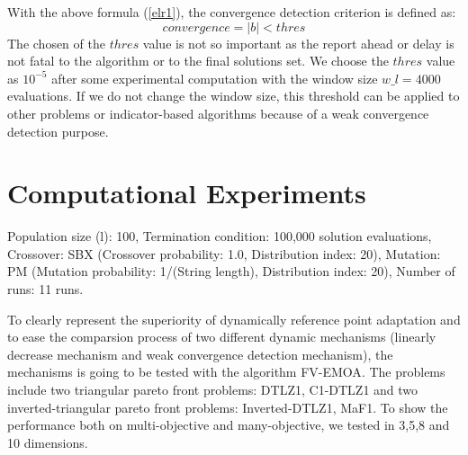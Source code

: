 \documentclass[conference]{IEEEtran}
\begin{document}
With the above formula (\ref{elr1}), the convergence detection criterion is defined as:
\begin{equation}\label{elr2}
  convergence = \lvert b \rvert < thres
\end{equation}
The chosen of the $thres$ value is not so important 
as the report ahead or delay is not fatal to the algorithm or to the final solutions set.
We choose the $thres$ value as $10^{-5}$ after some experimental computation with 
the window size $w\_ l = 4000$ evaluations. 
If we do not change the window size, 
this threshold can be applied to other problems or indicator-based algorithms
because of a weak convergence detection purpose.

% 
% 
%
\section{Computational Experiments}

Population size (l): 100,
Termination condition: 100,000 solution evaluations,
Crossover: SBX (Crossover probability: 1.0, Distribution index: 20),
Mutation: PM (Mutation probability: 1/(String length), Distribution index: 20),
Number of runs: 11 runs.

To clearly represent the superiority of dynamically reference point adaptation 
and to ease the comparsion process of two different dynamic mechanisms
(linearly decrease mechanism and weak convergence detection mechanism), 
the mechanisms is going to be tested with the algorithm FV-EMOA\cite{FVEMOA}. %
The problems include two triangular pareto front problems: 
DTLZ1\cite{DTLZ1}, C1-DTLZ1\cite{C1DTLZ1}
and two inverted-triangular pareto front problems: 
Inverted-DTLZ1\cite{IDTLZ1}, MaF1\cite{MaF1}.
To show the performance both on multi-objective and many-objective, we tested in 3,5,8 and 10 dimensions.
\end{document}

